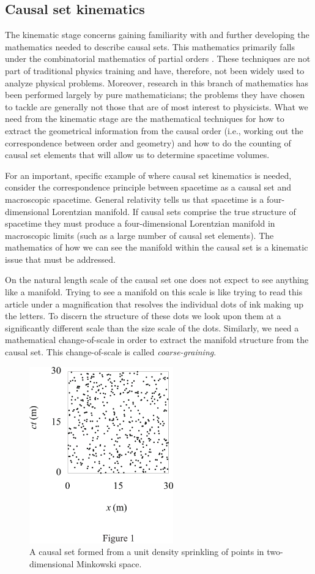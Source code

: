 \documentclass[aps,amssymb,12pt]{revtex4-2}
\begin{document}
\subsection{Causal set kinematics}

The kinematic stage concerns gaining familiarity with and further developing
the mathematics needed to describe causal sets. This mathematics primarily
falls under the combinatorial mathematics of partial orders \cite{23}. These
techniques are not part of traditional physics training and have, therefore,
not been widely used to analyze physical problems. Moreover, research in
this branch of mathematics has been performed largely by pure
mathematicians; the problems they have chosen to tackle are generally not
those that are of most interest to physicists. What we need from the
kinematic stage are the mathematical techniques for how to extract the
geometrical information from the causal order (i.e., working out the
correspondence between order and geometry) and how to do the counting of
causal set elements that will allow us to determine spacetime volumes.

For an important, specific example of where causal set kinematics is needed,
consider the correspondence principle between spacetime as a causal set and
macroscopic spacetime. General relativity tells us that spacetime is a
four-dimensional Lorentzian manifold. If causal sets comprise the true
structure of spacetime they must produce a four-dimensional Lorentzian
manifold in macroscopic limits (such as a large number of causal set
elements). The mathematics of how we can see the manifold within the causal
set is a kinematic issue that must be addressed.

On the natural length scale of the causal set one does not expect to see
anything like a manifold. Trying to see a manifold on this scale is like
trying to read this article under a magnification that resolves the
individual dots of ink making up the letters. To discern the structure of
these dots we look upon them at a significantly different scale than the
size scale of the dots. Similarly, we need a mathematical change-of-scale in
order to extract the manifold structure from the causal set. This
change-of-scale is called {\it coarse-graining}.

\begin{figure}[tp]
\centerline{\includegraphics[height=3in]{figure1.pdf}}
\caption{A causal set formed from a unit density sprinkling of points
in two-dimensional Minkowski space.}
\end{figure}
\end{document}
